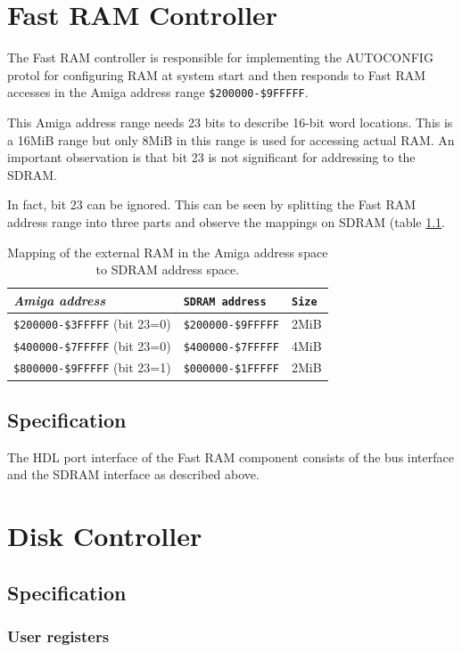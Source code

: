 \documentclass[a4paper]{report}
\begin{document}
\chapter{Fast RAM Controller}
The Fast RAM controller is responsible for implementing the AUTOCONFIG protol
for configuring RAM at system start and then responds to Fast RAM accesses
in the Amiga address range \texttt{\$200000-\$9FFFFF}.

This Amiga address range needs 23 bits to describe 16-bit word
locations. This is a \si{16}{MiB} range but only \si{8}{MiB}
in this range is used for accessing actual RAM. An important
observation is that bit 23 is not significant for addressing
to the SDRAM.

In fact, bit 23 can be ignored. This can be seen by splitting the
Fast RAM address range into three parts and observe the mappings on SDRAM (table \ref{fast_ranges}.

\begin{table}
\begin{tabular}{*3l}    \toprule
\emph{Amiga address}   & \texttt{SDRAM address}         & \texttt{Size} \\ \midrule
\texttt{\$200000-\$3FFFFF} (bit 23=0)& \texttt{\$200000-\$9FFFFF} & \si{2}{MiB}\\
\texttt{\$400000-\$7FFFFF} (bit 23=0)& \texttt{\$400000-\$7FFFFF} & \si{4}{MiB}\\
\texttt{\$800000-\$9FFFFF} (bit 23=1)& \texttt{\$000000-\$1FFFFF} & \si{2}{MiB}\\
\bottomrule
 \hline
\end{tabular}
\caption{Mapping of the external RAM in the Amiga address space to
SDRAM address space.}
\label{fast_ranges}
\end{table}

\section{Specification}
The HDL port interface of the Fast RAM component consists of
the bus interface and the SDRAM interface as described above.


\chapter{Disk Controller}
\section{Specification}
\subsection{User registers}
\end{document}
